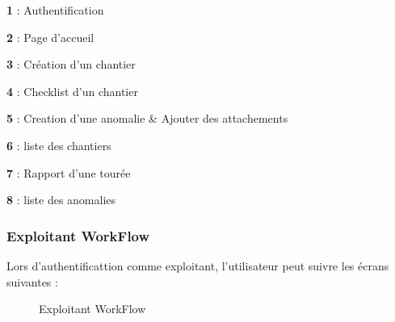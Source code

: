 \textbf{1} : Authentification

\textbf{2} : Page d'accueil

\textbf{3} : Cr\'eation d'un chantier

\textbf{4} : Checklist d'un chantier

\textbf{5} : Creation d'une anomalie \& Ajouter des attachements

\textbf{6} : liste des chantiers

\textbf{7} : Rapport d'une tour\'ee

\textbf{8} : liste des anomalies

\subsubsection{Exploitant WorkFlow}

Lors d'authentificattion comme exploitant, l'utilisateur peut suivre les \'ecrans suivantes :

\begin{figure}[H]
	\caption{\label{fig:my-label} Exploitant WorkFlow}
\end{figure}

